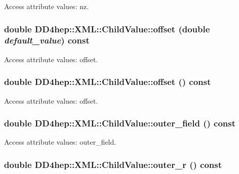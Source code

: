Access attribute values: nz. \hypertarget{struct_d_d4hep_1_1_x_m_l_1_1_child_value_a1d1191c49d89b4a1876679f55c9468f9}{
\subsubsection[{offset}]{\setlength{\rightskip}{0pt plus 5cm}double DD4hep::XML::ChildValue::offset (double {\em default\_\-value}) const}}
\label{struct_d_d4hep_1_1_x_m_l_1_1_child_value_a1d1191c49d89b4a1876679f55c9468f9}


Access attribute values: offset. \hypertarget{struct_d_d4hep_1_1_x_m_l_1_1_child_value_a6b764c53aa57278d08eea47caaf073c1}{
\subsubsection[{offset}]{\setlength{\rightskip}{0pt plus 5cm}double DD4hep::XML::ChildValue::offset () const}}
\label{struct_d_d4hep_1_1_x_m_l_1_1_child_value_a6b764c53aa57278d08eea47caaf073c1}


Access attribute values: offset. \hypertarget{struct_d_d4hep_1_1_x_m_l_1_1_child_value_ad9fe2f7f8dc5389e23da5f129c7028ee}{
\subsubsection[{outer\_\-field}]{\setlength{\rightskip}{0pt plus 5cm}double DD4hep::XML::ChildValue::outer\_\-field () const}}
\label{struct_d_d4hep_1_1_x_m_l_1_1_child_value_ad9fe2f7f8dc5389e23da5f129c7028ee}


Access attribute values: outer\_\-field. \hypertarget{struct_d_d4hep_1_1_x_m_l_1_1_child_value_a7c945d8f527043e8301af1e5fc55496a}{
\subsubsection[{outer\_\-r}]{\setlength{\rightskip}{0pt plus 5cm}double DD4hep::XML::ChildValue::outer\_\-r () const}}
\label{struct_d_d4hep_1_1_x_m_l_1_1_child_value_a7c945d8f527043e8301af1e5fc55496a}



